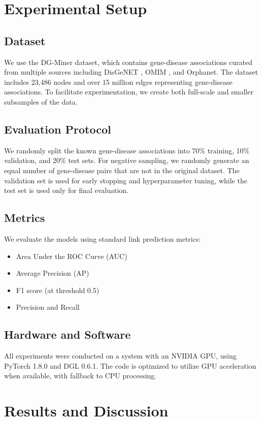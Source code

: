\documentclass[conference]{IEEEtran}
\begin{document}
\section{Experimental Setup}
\subsection{Dataset}
We use the DG-Miner dataset, which contains gene-disease associations curated from multiple sources including DisGeNET \cite{pinero2020disgenet}, OMIM \cite{amberger2019omim}, and Orphanet. The dataset includes 23,486 nodes and over 15 million edges representing gene-disease associations. To facilitate experimentation, we create both full-scale and smaller subsamples of the data.

\subsection{Evaluation Protocol}
We randomly split the known gene-disease associations into 70\% training, 10\% validation, and 20\% test sets. For negative sampling, we randomly generate an equal number of gene-disease pairs that are not in the original dataset. The validation set is used for early stopping and hyperparameter tuning, while the test set is used only for final evaluation.

\subsection{Metrics}
We evaluate the models using standard link prediction metrics:
\begin{itemize}
\item Area Under the ROC Curve (AUC)
\item Average Precision (AP)
\item F1 score (at threshold 0.5)
\item Precision and Recall
\end{itemize}

\subsection{Hardware and Software}
All experiments were conducted on a system with an NVIDIA GPU, using PyTorch 1.8.0 and DGL 0.6.1. The code is optimized to utilize GPU acceleration when available, with fallback to CPU processing.

\section{Results and Discussion}
\end{document}
